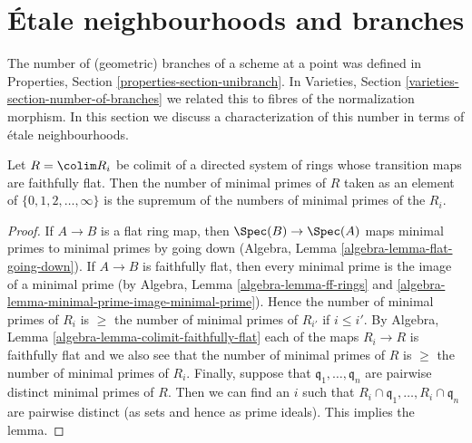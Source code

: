 \section{\'Etale neighbourhoods and branches}
\label{section-etale-nbhds-branches}

\noindent
The number of (geometric) branches of a scheme at a point was
defined in Properties, Section \ref{properties-section-unibranch}.
In Varieties, Section \ref{varieties-section-number-of-branches}
we related this to fibres of the normalization morphism.
In this section we discuss a characterization of this number in terms of
\'etale neighbourhoods.

\begin{lemma}
\label{lemma-nr-minimal-primes}
Let $R = \colim R_i$ be colimit of a directed system of rings
whose transition maps are faithfully flat.
Then the number of minimal primes of $R$
taken as an element of $\{0, 1, 2, \ldots, \infty\}$
is the supremum of the numbers of minimal primes of the $R_i$.
\end{lemma}

\begin{proof}
If $A \to B$ is a flat ring map, then $\Spec(B) \to \Spec(A)$
maps minimal primes to minimal primes by going down
(Algebra, Lemma \ref{algebra-lemma-flat-going-down}).
If $A \to B$ is faithfully flat, then every minimal
prime is the image of a minimal prime (by
Algebra, Lemma \ref{algebra-lemma-ff-rings} and
\ref{algebra-lemma-minimal-prime-image-minimal-prime}).
Hence the number of minimal primes of $R_i$ is
$\geq$ the number of minimal primes of $R_{i'}$ if $i \leq i'$.
By Algebra, Lemma \ref{algebra-lemma-colimit-faithfully-flat}
each of the maps $R_i \to R$ is
faithfully flat and we also see that
the number of minimal primes of $R$ is
$\geq$ the number of minimal primes of $R_i$.
Finally, suppose that $\mathfrak q_1, \ldots, \mathfrak q_n$
are pairwise distinct minimal primes of $R$. Then we can
find an $i$ such that $R_i \cap \mathfrak q_1, \ldots, R_i \cap \mathfrak q_n$
are pairwise distinct (as sets and hence as prime ideals).
This implies the lemma.
\end{proof}

